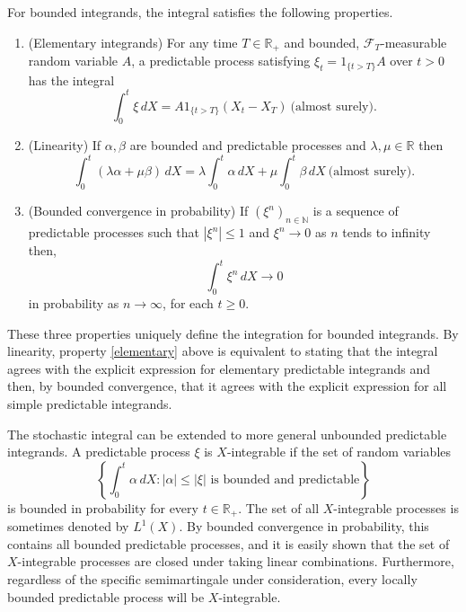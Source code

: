 \documentclass[12pt]{article}
\begin{document}
For bounded integrands, the integral satisfies the following properties.
\begin{enumerate}
\item\label{elementary} (Elementary integrands)
For any time $T\in\mathbb{R}_+$ and bounded, $\mathcal{F}_T$-measurable random variable $A$, a predictable process satisfying $\xi_t=1_{\{t>T\}}A$ over $t>0$ has the integral
\begin{equation*}
\int_0^t\xi\,dX = A1_{\{t>T\}}(X_t-X_T)\ \textrm{(almost surely)}.
\end{equation*}
\item (Linearity) If $\alpha,\beta$ are bounded and predictable processes and $\lambda,\mu\in\mathbb{R}$ then
\begin{equation}\label{eq:linearity}
\int_0^t\left(\lambda\alpha+\mu\beta\right)\,dX = \lambda\int_0^t\alpha\,dX+\mu\int_0^t\beta\,dX\ \textrm{(almost surely).}
\end{equation}
\item (Bounded convergence in probability)
If $(\xi^n)_{n\in\mathbb{N}}$ is a sequence of predictable processes such that $|\xi^n|\le 1$ and $\xi^n\rightarrow 0$ as $n$ tends to infinity then,
\begin{equation*}
\int_0^t\xi^n\,dX\rightarrow 0
\end{equation*}
in probability as $n\rightarrow\infty$, for each $t\ge 0$.
\end{enumerate}

These three properties uniquely define the integration for bounded integrands.
By linearity, property \ref{elementary} above is equivalent to stating that the integral agrees with the explicit expression for elementary predictable integrands and then, by bounded convergence, that it agrees with the explicit expression for all simple predictable integrands.

The stochastic integral can be extended to more general unbounded predictable integrands.
A predictable process $\xi$ is $X$-integrable if the set of random variables
\begin{equation*}
\left\{\int_0^t\alpha\,dX:|\alpha|\le |\xi|\textrm{ is bounded and predictable}\right\}
\end{equation*}
is bounded in probability for every $t\in\mathbb{R}_+$.
The set of all $X$-integrable processes is sometimes denoted by $L^1(X)$. By bounded convergence in probability, this contains all bounded predictable processes, and it is easily shown that the set of $X$-integrable processes are closed under taking linear combinations.
Furthermore, regardless of the specific semimartingale under consideration, every locally bounded predictable process will be $X$-integrable.
\end{document}
